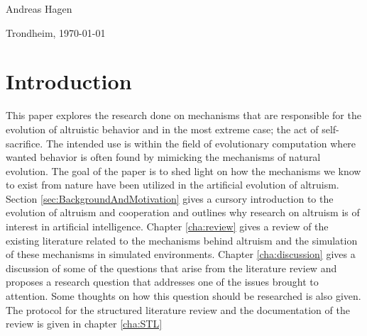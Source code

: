 \documentclass[a4paper]{book}
\newcommand{\thesisAuthor}{Andreas Hagen}
\begin{document}
\hfill \thesisAuthor

\hfill Trondheim, \today

\clearpage

\tableofcontents



\mainmatter

\chapter{Introduction}
\label{cha:Introduction}

This paper explores the research done on mechanisms that are responsible for the evolution of altruistic behavior and in the most extreme case; the act of self-sacrifice.
The intended use is within the field of evolutionary computation where wanted behavior is often found by mimicking the mechanisms of natural evolution. 
The goal of the paper is to shed light on how the mechanisms we know to exist from nature have been utilized in the artificial evolution of altruism.
Section \ref{sec:BackgroundAndMotivation} gives a cursory introduction to the evolution of altruism and cooperation and outlines why research on altruism is of interest in artificial intelligence.
Chapter \ref{cha:review} gives a review of the existing literature related to the mechanisms behind altruism and the simulation of these mechanisms in simulated 
environments. Chapter \ref{cha:discussion} gives a discussion of some of the questions that arise from the literature review and proposes a research question
that addresses one of the issues brought to attention. Some thoughts on how this question should be researched is also given. The protocol for the structured literature review and the documentation of the review is given in chapter \ref{cha:STL}


\end{document}
